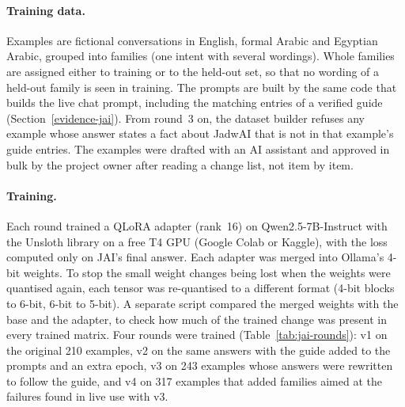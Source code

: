 \paragraph{Training data.} Examples are fictional conversations in English, formal Arabic and Egyptian Arabic, grouped into families (one intent with several wordings). Whole families are assigned either to training or to the held-out set, so that no wording of a held-out family is seen in training. The prompts are built by the same code that builds the live chat prompt, including the matching entries of a verified guide (Section~\ref{evidence-jai}). From round~3 on, the dataset builder refuses any example whose answer states a fact about JadwAI that is not in that example's guide entries. The examples were drafted with an AI assistant and approved in bulk by the project owner after reading a change list, not item by item.

\paragraph{Training.} Each round trained a QLoRA adapter (rank~16) on Qwen2.5-7B-Instruct with the Unsloth library on a free T4 GPU (Google Colab or Kaggle), with the loss computed only on JAI's final answer. Each adapter was merged into Ollama's 4-bit weights. To stop the small weight changes being lost when the weights were quantised again, each tensor was re-quantised to a different format (4-bit blocks to 6-bit, 6-bit to 5-bit). A separate script compared the merged weights with the base and the adapter, to check how much of the trained change was present in every trained matrix. Four rounds were trained (Table~\ref{tab:jai-rounds}): v1 on the original 210 examples, v2 on the same answers with the guide added to the prompts and an extra epoch, v3 on 243 examples whose answers were rewritten to follow the guide, and v4 on 317 examples that added families aimed at the failures found in live use with v3.

